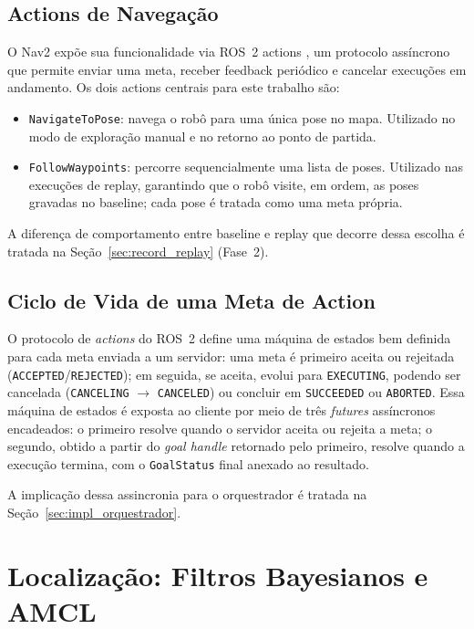 \subsection{Actions de Navegação}
\label{sec:actions}

O Nav2 expõe sua funcionalidade via ROS~2 actions \cite{macenski2022ros2}, um protocolo assíncrono
que permite enviar uma meta, receber feedback periódico e cancelar execuções em
andamento. Os dois actions centrais para este trabalho são:

\begin{itemize}
    \item \texttt{NavigateToPose}: navega o robô para uma única pose no mapa.
    Utilizado no modo de exploração manual e no retorno ao ponto de partida.

    \item \texttt{FollowWaypoints}: percorre sequencialmente uma lista de poses.
    Utilizado nas execuções de replay, garantindo que o robô visite, em ordem,
    as poses gravadas no baseline; cada pose é tratada como uma meta própria.
\end{itemize}

A diferença de comportamento entre baseline e replay que decorre dessa
escolha é tratada na Seção~\ref{sec:record_replay} (Fase~2).

\subsection{Ciclo de Vida de uma Meta de Action}
\label{sec:action_lifecycle}

O protocolo de \textit{actions} do ROS~2 define uma máquina de estados bem
definida para cada meta enviada a um servidor: uma meta é primeiro aceita ou
rejeitada (\texttt{ACCEPTED}/\allowbreak\texttt{REJECTED}); em seguida, se aceita, evolui
para \texttt{EXECUTING}, podendo ser cancelada (\texttt{CANCELING} $\to$
\texttt{CANCELED}) ou concluir em \texttt{SUCCEEDED} ou \texttt{ABORTED}. Essa
máquina de estados é exposta ao cliente por meio de três \textit{futures}
assíncronos encadeados: o primeiro resolve quando o servidor aceita ou rejeita
a meta; o segundo, obtido a partir do \textit{goal handle} retornado pelo
primeiro, resolve quando a execução termina, com o \texttt{GoalStatus} final
anexado ao resultado.

A implicação dessa assincronia para o orquestrador é tratada na
Seção~\ref{sec:impl_orquestrador}.

\section{Localização: Filtros Bayesianos e AMCL}
\label{sec:localizacao_bayes}

